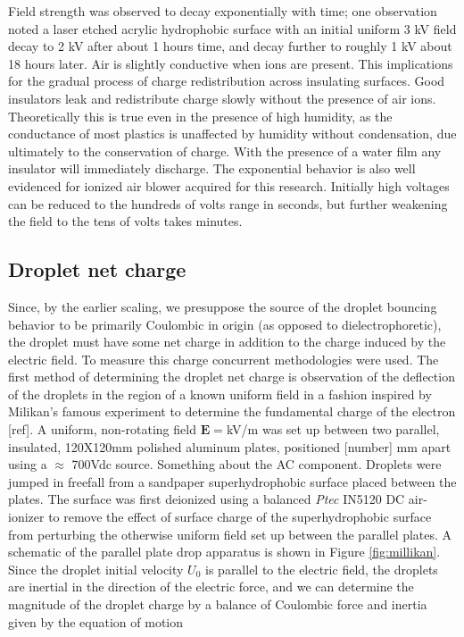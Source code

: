 \documentclass{jfm}
\begin{document}
Field strength was observed to decay exponentially with time; one observation noted a laser etched acrylic hydrophobic surface with an initial uniform 3 kV field decay to 2 kV after about 1 hours time, and decay further to roughly 1 kV about 18 hours later. Air is slightly conductive when ions are present. This implications for the gradual process of charge redistribution across insulating surfaces. Good insulators leak and redistribute charge slowly without the presence of air ions. Theoretically this is true even in the presence of high humidity, as the conductance of most plastics is unaffected by humidity without condensation, due ultimately to the conservation of charge. With the presence of a water film any insulator will immediately discharge. The exponential behavior is also well evidenced for ionized air blower acquired for this research. Initially high voltages can be reduced to the hundreds of volts range in seconds, but further weakening the field to the tens of volts takes minutes.

\subsection{Droplet net charge}
Since, by the earlier scaling, we presuppose the source of the droplet bouncing behavior to be primarily Coulombic in origin (as opposed to dielectrophoretic), the droplet must have some net charge in addition to the charge induced by the electric field. To measure this charge concurrent methodologies were used. The first method of determining the droplet net charge is observation of the deflection of the droplets in the region of a known uniform field in a fashion inspired by Milikan's famous experiment to determine the fundamental charge of the electron [ref]. A uniform, non-rotating field $\mathbf{E}=$kV/m was set up between two parallel, insulated, 120X120mm polished aluminum plates, positioned [number] mm apart using a $\approx$ 700Vdc source. Something about the AC component. Droplets were jumped in freefall from a sandpaper superhydrophobic surface placed between the plates. The surface was first deionized using a balanced \emph{Ptec} IN5120 DC air-ionizer to remove the effect of surface charge of the superhydrophobic surface from perturbing the otherwise uniform field set up between the parallel plates. A schematic of the parallel plate drop apparatus is shown in Figure \ref{fig:millikan}. Since the droplet initial velocity $U_0$ is parallel to the electric field, the droplets are inertial in the direction of the electric force, and we can determine the magnitude of the droplet charge by a balance of Coulombic force and inertia given by the equation of motion
\end{document}
